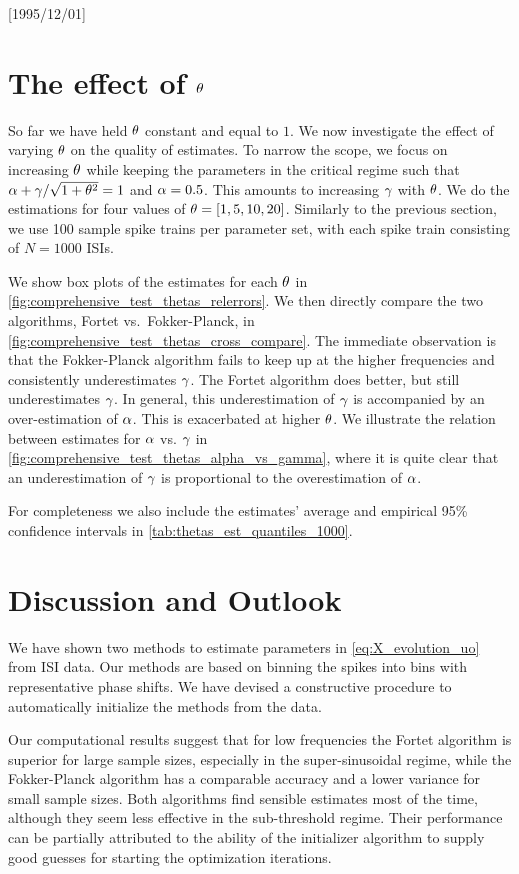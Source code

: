 \NeedsTeXFormat{LaTeX2e}[1995/12/01] \documentclass[10pt]{bmc_article}
\newenvironment{bmcformat}{\begin{raggedright}\baselineskip20pt\sloppy\setboolean{publ}{false}}{\end{raggedright}\baselineskip20pt\sloppy}
\begin{document}
\begin{bmcformat}






\section{The effect of ${\theta}$}
So far we have held ${\theta}$ constant and equal to $1$. We now investigate the
effect of varying ${\theta}$ on the quality of estimates. To narrow the scope, we
focus on increasing ${\theta}$ while keeping the parameters in the critical regime
such that ${\alpha} + {\gamma }/\sqrt{1+{\theta}^2} = 1$ and ${\alpha}=0.5$. This amounts to increasing
${\gamma }$ with ${\theta}$. We do the estimations for four values of ${\theta}=[1,5,10,20]$.
Similarly to the previous section, we use 100 sample spike trains per 
parameter set, with each spike train consisting of $N=1000$ ISIs.

We show box plots of the estimates for each ${\theta}$ in
\cref{fig:comprehensive_test_thetas_relerrors}. We then directly compare the two
algorithms, Fortet vs.\ Fokker-Planck, in
\cref{fig:comprehensive_test_thetas_cross_compare}. The immediate observation is
that the Fokker-Planck algorithm fails to keep up at the higher frequencies and
consistently underestimates ${\gamma }$. The Fortet algorithm does better, but still
underestimates ${\gamma }$. In general, this underestimation of ${\gamma }$ is accompanied by
an over-estimation of ${\alpha}$. This is exacerbated at higher ${\theta}$. We illustrate
the relation between estimates for ${\alpha}$ vs. ${\gamma }$ in
\cref{fig:comprehensive_test_thetas_alpha_vs_gamma}, where it is quite clear
that an underestimation of ${\gamma }$ is proportional to the overestimation of ${\alpha}$.

For completeness we also include the estimates' average and empirical 95\%
confidence intervals in \cref{tab:thetas_est_quantiles_1000}.

\section{Discussion and Outlook}
\label{sec:discusion}
We have shown two methods to estimate parameters in
\cref{eq:X_evolution_uo} from ISI data. Our methods are based
on binning the spikes into bins with representative phase shifts. We have
devised a constructive procedure to automatically initialize the methods from
the data.

Our computational results suggest that for low frequencies the Fortet algorithm
is superior for large sample sizes, especially in the super-sinusoidal regime, while the
Fokker-Planck algorithm has a comparable accuracy and a lower variance for small
sample sizes. Both algorithms find sensible estimates most of the time, although
they seem less effective in the sub-threshold regime. Their performance can
be partially attributed to the ability of the initializer algorithm to supply
good guesses for starting the optimization iterations.


\end{bmcformat}
\end{document}
